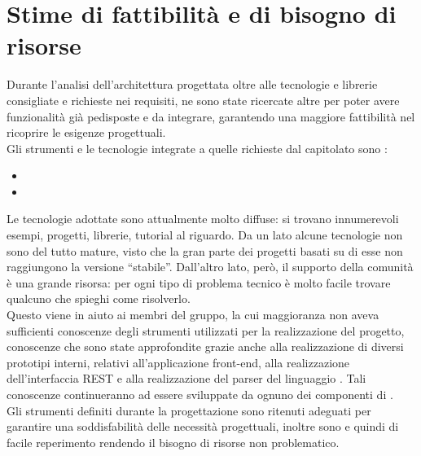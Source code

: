 \section{Stime di fattibilità e di bisogno di risorse}

Durante l'analisi dell'architettura progettata oltre alle tecnologie e librerie consigliate e richieste nei requisiti, ne sono state ricercate altre per poter avere funzionalità già pedisposte e da integrare, garantendo una maggiore fattibilità nel ricoprire le esigenze progettuali. \\
Gli strumenti e le tecnologie integrate a quelle richieste dal capitolato sono : 
\begin{itemize}
\item 
\item 
\end{itemize}

Le tecnologie adottate sono attualmente molto diffuse: si trovano innumerevoli esempi, progetti, librerie, tutorial al riguardo. Da un lato alcune tecnologie non sono del tutto mature, visto che la gran parte dei progetti basati su di esse non raggiungono la versione ``stabile''. Dall'altro lato, però, il supporto della comunità è una grande risorsa: per ogni tipo di problema tecnico è molto facile trovare qualcuno che spieghi come risolverlo. \\
Questo viene in aiuto ai membri del gruppo, la cui maggioranza non aveva sufficienti conoscenze degli strumenti utilizzati per la realizzazione del progetto, conoscenze che sono state approfondite grazie anche alla realizzazione di diversi prototipi interni, relativi all'applicazione front-end, alla realizzazione dell'interfaccia REST e alla realizzazione del parser del linguaggio .
Tali conoscenze continueranno ad essere sviluppate da ognuno dei componenti di \GroupName{}. \\

Gli strumenti definiti durante la progettazione sono ritenuti adeguati per garantire una soddisfabilità delle necessità progettuali, inoltre sono  e quindi di facile reperimento rendendo il bisogno di risorse non problematico.



